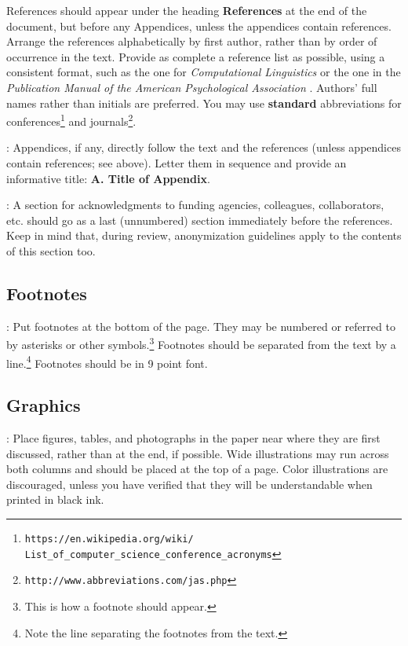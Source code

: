 \documentclass[11pt,letterpaper]{article}
\newcommand\BibTeX{B{\sc ib}\TeX}
\begin{document}
References should appear under the heading {\bf References} at the end of
the document, but before any Appendices, unless the appendices contain
references. Arrange the references alphabetically by first author, rather
than by order of occurrence in the text.
Provide as complete a reference list as possible, using a consistent format,
such as the one for {\em Computational Linguistics\/} or the one in the 
{\em Publication Manual of the American Psychological Association\/}
\cite{APA:83}. Authors' full names rather than initials are preferred. You
may use {\bf standard} abbreviations for conferences\footnote{\scriptsize {\tt https://en.wikipedia.org/wiki/ \\ \-\hspace{.75cm} List\_of\_computer\_science\_conference\_acronyms}}
and journals\footnote{\tt http://www.abbreviations.com/jas.php}.

: Appendices, if any, directly follow the text and
the references (unless appendices contain references; see above). Letter
them in sequence and provide an informative title: {\bf A. Title of Appendix}.

: A section for acknowledgments to funding
agencies, colleagues, collaborators, etc. should go as a last (unnumbered)
section immediately before the references. Keep in mind that, during review,
anonymization guidelines apply to the contents of this section too.

\subsection{Footnotes}

: Put footnotes at the bottom of the page. They may be
numbered or referred to by asterisks or other symbols.\footnote{This is
how a footnote should appear.} Footnotes should be separated from the text
by a line.\footnote{Note the line separating the footnotes from the text.}
Footnotes should be in 9 point font.

\subsection{Graphics}

: Place figures, tables, and photographs in the
paper near where they are first discussed, rather than at the end, if possible.
Wide illustrations may run across both columns and should be placed at the
top of a page. Color illustrations are discouraged, unless you have verified
that they will be understandable when printed in black ink. 
\end{document}
